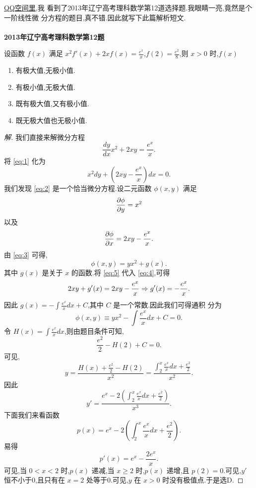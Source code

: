 \documentclass[a4paper, 12pt]{article} %
\begin{document}
\begin{CJK}{UTF8}{gkai}
\href{http://user.qzone.qq.com/350601384/blog/1384324917}{QQ空间里},我
看到了2013年辽宁高考理科数学第12道选择题.我眼睛一亮,竟然是个一阶线性微
分方程的题目,真不错.因此就写下此篇解析短文.\\\\
\textbf{2013年辽宁高考理科数学第12题}
\begin{shaded}
设函数 $f(x)$ 满足
$x^2f'(x)+2xf(x)=\frac{e^x}{x}$,$f(2)=\frac{e^2}{8}$,则 $x>0$ 时,$f(x)$
\begin{enumerate}[A]
\item 有极大值,无极小值.
\item 有极小值,无极大值.
\item 既有极大值,又有极小值.
\item 既无极大值也无极小值.
\end{enumerate}
\end{shaded}
\begin{proof}[解]
我们直接来解微分方程
\begin{equation}
  \label{eq:1}
 \frac{dy}{dx}x^2+2xy=\frac{e^x}{x}.
\end{equation}
将 \eqref{eq:1} 化为
\begin{equation}
  \label{eq:2}
  x^2dy+(2xy-\frac{e^x}{x})dx=0.
\end{equation}
我们发现 \eqref{eq:2} 是一个恰当微分方程.设二元函数 $\phi(x,y)$ 满足
\begin{equation}
  \label{eq:3}
    \frac{\partial\phi}{\partial y}=x^2
\end{equation}
以及
\begin{equation}
  \label{eq:4}
  \frac{\partial\phi}{\partial x}=2xy-\frac{e^x}{x}.
\end{equation}
由 \eqref{eq:3} 可得,
\begin{equation}
  \label{eq:5}
  \phi(x,y)=yx^2+g(x).
\end{equation}
其中 $g(x)$ 是关于 $x$ 的函数.将 \eqref{eq:5} 代入 \eqref{eq:4},可得
\begin{equation}
  \label{eq:6}
  2xy+g'(x)=2xy-\frac{e^x}{x}\Rightarrow g'(x)=-\frac{e^x}{x}.
\end{equation}
因此 $g(x)=-\int \frac{e^x}{x}dx+C$,其中 $C$ 是一个常数.因此我们可得通积
分为
$$
\phi(x,y)\equiv yx^2-\int \frac{e^x}{x}dx+C=0.
$$
令 $H(x)=\int \frac{e^x}{x}dx$,则由题目条件可知,
$$
\frac{e^2}{2}-H(2)+C=0.
$$
可见,
$$
y=\frac{H(x)+\frac{e^2}{2}-H(2)}{x^2}=\frac{\int_2^x \frac{e^x}{x}dx+\frac{e^2}{2}}{x^2}.
$$
因此
$$
y'=\frac{e^{x}-2(\int_2^{x} \frac{e^{x}}{x}dx+\frac{e^2}{2})}{x^3}.
$$
下面我们来看函数
$$
p(x)=e^x-2(\int_2^x \frac{e^x}{x}dx+\frac{e^2}{2}).
$$
易得
$$
p'(x)=e^x-\frac{2e^x}{x}.
$$
可见,当 $0<x<2$ 时,$p(x)$ 递减,当 $x\geq 2$ 时,$p(x)$ 递增,且
$p(2)=0$.可见,$y'$ 恒不小于0,且只有在 $x=2$ 处等于0.可见,$y$ 在 $x>0$
时没有极值点.于是选D.
\end{proof}
  

\end{CJK}
\end{document}
